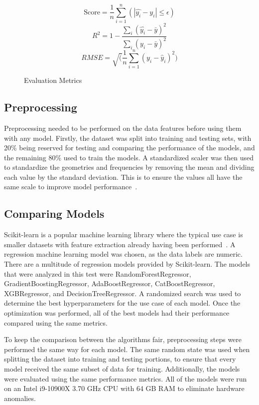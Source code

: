\documentclass[conference]{IEEEtran}
\begin{document}
\begin{figure}[h]
    \begin{equation}
        \text{Score} = \frac{1}{n} \sum_{i=1}^{n}(\left|\hat{y_i} - y_i\right| \leq \epsilon)
        \label{eq:tolerance}
    \end{equation}
    \begin{equation}
        R^2 = 1 - \frac{\sum_{i}(\hat{y_i} - \bar{y})^2}{\sum_{i}(y_i - \bar{y})^2}
        \label{eq:rsquared}
    \end{equation}
    \begin{equation}
        {RMSE} = \sqrt(\frac{1}{n} \sum_{i=1}^{n}(y_i - \hat{y}_i)^2)
        \label{eq:rmse}
    \end{equation}
    \caption{Evaluation Metrics}
\end{figure}


\subsection{Preprocessing}
Preprocessing needed to be performed on the data features before using them with any model. Firstly, the dataset was split into training and testing sets, with 20\% being reserved for testing and comparing the performance of the models, and the remaining 80\% used to train the models. A standardized scaler was then used to standardize the geometries and frequencies by removing the mean and dividing each value by the standard deviation. This is to ensure the values all have the same scale to improve model performance~\cite{9119820}. 


\subsection{Comparing Models}
Scikit-learn is a popular machine learning library where the typical use case is smaller datasets with feature extraction already having been performed~\cite{scikit-learn}. A regression machine learning model was chosen, as the data labels are numeric. There are a multitude of regression models provided by Scikit-learn. The models that were analyzed in this test were RandomForestRegressor, GradientBoostingRegressor, AdaBoostRegressor, CatBoostRegressor, XGBRegressor, and DecisionTreeRegressor. A randomized search was used to determine the best hyperparameters for the use case of each model. Once the optimization was performed, all of the best models had their performance compared using the same metrics. 

To keep the comparison between the algorithms fair, preprocessing steps were performed the same way for each model. The same random state was used when splitting the dataset into training and testing portions, to ensure that every model received the same subset of data for training. Additionally, the models were evaluated using the same performance metrics. All of the models were run on an Intel i9-10900X 3.70 GHz CPU with 64 GB RAM to eliminate hardware anomalies.
\end{document}
